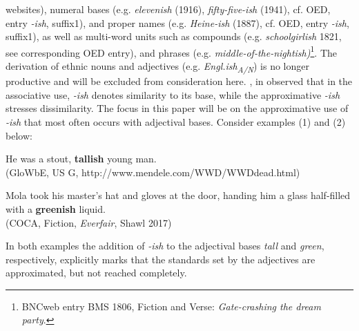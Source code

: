 \documentclass[output=paper
,modfonts
,nonflat]{langsci/langscibook}
\begin{document}
websites), numeral bases (e.g.  \textit{elevenish} (1916),  \textit{fifty-five-ish} (1941), cf. OED, entry \textit{-ish}, suffix1), and proper names (e.g.  \textit{Heine-ish} (1887), cf. OED, entry \textit{-ish}, suffix1), as well as multi-word units such as compounds (e.g.  \textit{schoolgirlish} 1821, see corresponding OED entry), and phrases (e.g.  \textit{middle-of-the-nightish)}\footnote{BNCweb entry BMS 1806, Fiction and Verse: \textit{Gate-crashing the dream party}.}. The derivation of ethnic nouns and adjectives (e.g.  \textit{Engl.ish\textsubscript{A/N}}) is no longer productive and will be excluded from consideration here. \textcite{Kuzmack2007}, in \textcite*[234]{Traugott2013} observed that in the associative use,  \textit{-ish} denotes similarity to its base, while the approximative  \textit{-ish} stresses dissimilarity. The focus in this paper will be on the approximative use of  \textit{-ish} that most often occurs with adjectival bases. Consider examples (1) and (2) below:
\begin{examples}
	\item He was a stout, \textbf{tallish} young man. \\ (GloWbE, US G, http://www.mendele.com/WWD/WWDdead.html)
	\item Mola took his master's hat and gloves at the door, handing him a glass half-filled with a \textbf{greenish} liquid. \\ (COCA, Fiction, \textit{Everfair}, Shawl 2017)
\end{examples}

In both examples the addition of \textit{-ish} to the adjectival bases  \textit{tall} and  \textit{green}, respectively, explicitly marks that the standards set by the adjectives are approximated, but not reached completely.
\end{document}
